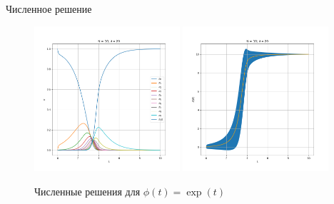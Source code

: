 \begin{frame}{Численное решение}
{			\begin{figure}
				\centering
				\includegraphics[width=0.48\textwidth, keepaspectratio]{../img/numeric_sol/probabilities_N_10_lambda_20_exp.png}
				\includegraphics[width=0.48\textwidth, keepaspectratio]{../img/numeric_sol/avers_N_10_lambda_20_exp.png}
				\caption{Численные решения для $ \phi(t) = \exp(t) $}
			\end{figure}
		}
		
	\end{frame}
	
